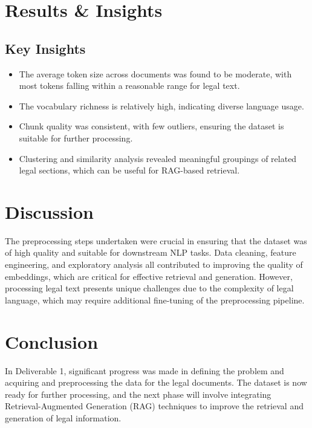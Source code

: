 \documentclass{article}
\begin{document}
\newpage

\section{Results \& Insights}

\subsection{Key Insights}
\begin{itemize}
    \item The average token size across documents was found to be moderate, with most tokens falling within a reasonable range for legal text.
    \item The vocabulary richness is relatively high, indicating diverse language usage.
    \item Chunk quality was consistent, with few outliers, ensuring the dataset is suitable for further processing.
    \item Clustering and similarity analysis revealed meaningful groupings of related legal sections, which can be useful for RAG-based retrieval.
\end{itemize}

\section{Discussion}
The preprocessing steps undertaken were crucial in ensuring that the dataset was of high quality and suitable for downstream NLP tasks. Data cleaning, feature engineering, and exploratory analysis all contributed to improving the quality of embeddings, which are critical for effective retrieval and generation. However, processing legal text presents unique challenges due to the complexity of legal language, which may require additional fine-tuning of the preprocessing pipeline.

\section{Conclusion}
In Deliverable 1, significant progress was made in defining the problem and acquiring and preprocessing the data for the legal documents. The dataset is now ready for further processing, and the next phase will involve integrating Retrieval-Augmented Generation (RAG) techniques to improve the retrieval and generation of legal information.

\newpage
\end{document}
